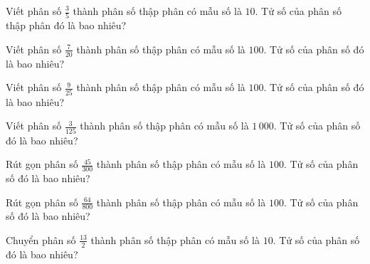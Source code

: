 
\begin{ex}
  Viết phân số $\frac{3}{5}$ thành phân số thập phân có mẫu số là $10$. Tử số của phân số thập phân đó là bao nhiêu?
\end{ex}

\begin{ex}
  Viết phân số $\frac{7}{20}$ thành phân số thập phân có mẫu số là $100$. Tử số của phân số đó là bao nhiêu?
\end{ex}

\begin{ex}
  Viết phân số $\frac{9}{25}$ thành phân số thập phân có mẫu số là $100$. Tử số của phân số đó là bao nhiêu?
\end{ex}

\begin{ex}
  Viết phân số $\frac{3}{125}$ thành phân số thập phân có mẫu số là $1\,000$. Tử số của phân số đó là bao nhiêu?
\end{ex}

\begin{ex}
  Rút gọn phân số $\frac{45}{300}$ thành phân số thập phân có mẫu số là $100$. Tử số của phân số đó là bao nhiêu?
\end{ex}

\begin{ex}
  Rút gọn phân số $\frac{64}{800}$ thành phân số thập phân có mẫu số là $100$. Tử số của phân số đó là bao nhiêu?
\end{ex}

\begin{ex}
  Chuyển phân số $\frac{13}{2}$ thành phân số thập phân có mẫu số là $10$. Tử số của phân số đó là bao nhiêu?
\end{ex}

